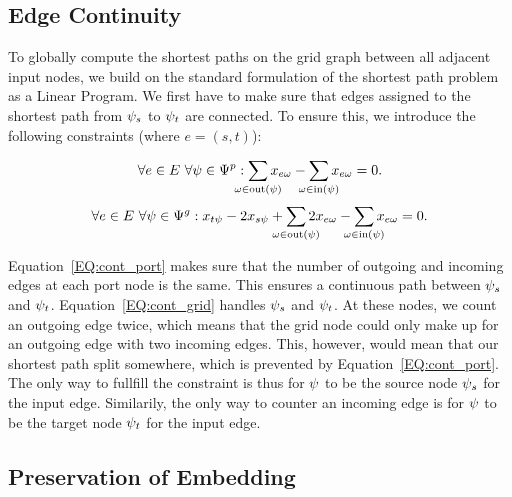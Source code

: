 \documentclass{sig-alternate-sigmod09}
\begin{document}
\subsection{Edge Continuity}

To globally compute the shortest paths on the grid graph between all adjacent input nodes, we build on the standard formulation of the shortest path problem as a Linear Program.
We first have to make sure that edges assigned to the shortest path from $\psi_s$ to $\psi_t$ are connected.
To ensure this, we introduce the following constraints (where $e = (s, t)$):

\newcommand\Psum[1]{\sum_{\makebox[0pt]{$\scriptstyle#1$}}}

\begin{equation}
  \forall e \in E\ \forall \psi \in \Psi^p: \Psum{\omega \in \text{out}(\psi)} x_{e\omega} - \Psum{\omega \in \text{in}(\psi)} x_{e\omega} = 0. \label{EQ:cont_port}
\end{equation}
\begin{equation}
	\begin{split}
  	\forall e \in E\ \forall \psi \in \Psi^g: x_{t\psi} - 2x_{s\psi} + \Psum{\omega \in \text{out}(\psi)} 2x_{e\omega} - \Psum{\omega \in \text{in}(\psi)} x_{e\omega} = 0. \label{EQ:cont_grid}
  \end{split}
\end{equation}

Equation~\ref{EQ:cont_port} makes sure that the number of outgoing and incoming edges at each port node is the same.
This ensures a continuous path between $\psi_s$ and $\psi_t$.
%
Equation~\ref{EQ:cont_grid} handles $\psi_s$ and $\psi_t$.
At these nodes, we count an outgoing edge twice, which means that the grid node could only make up for an outgoing edge with two incoming edges.
This, however, would mean that our shortest path split somewhere, which is prevented by Equation~\ref{EQ:cont_port}.
The only way to fullfill the constraint is thus for $\psi$ to be the source node $\psi_s$ for the input edge.
Similarily, the only way to counter an incoming edge is for $\psi$ to be the target node $\psi_t$ for the input edge.

\subsection{Preservation of Embedding}
\end{document}
